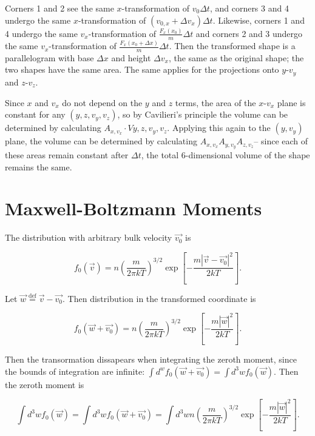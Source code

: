 \documentclass{hw-template}
\renewcommand{\defeq}{\stackrel{\text{def}}{=}}
\begin{document}
Corners 1 and 2 see the same $x$-transformation of $v_0 \Delta t$, and corners 3 and 4 undergo the same $x$-transformation of $(v_{0, x} + \Delta v_x)\Delta t$. Likewise, corners 1 and 4 undergo the same $v_x$-transformation of $\frac{F_x(x_0)}{m}\Delta t$ and corners 2 and 3 undergo the same $v_x$-transformation of $\frac{F_x(x_0 + \Delta x)}{m}\Delta t$. Then the transformed shape is a parallelogram with base $\Delta x$ and height $\Delta v_x$, the same as the original shape; the two shapes have the same area. The same applies for the projections onto $y$-$v_y$ and $z$-$v_z$.



Since $x$ and $v_x$ do not depend on the $y$ and $z$ terms, the area of the $x$-$v_x$ plane is constant for any $(y, z, v_y, v_z)$, so by Cavilieri's principle the volume can be determined by calculating $A_{x, v_x}\cdot V{y, z, v_y, v_z}$. Applying this again to the $(y, v_y)$ plane, the volume can be determined by calculating $A_{x, v_x}A_{y, v_y}A_{z, v_z}$-- since each of these areas remain constant after $\Delta t$, the total 6-dimensional volume of the shape remains the same.







\section{Maxwell-Boltzmann Moments}

The distribution with arbitrary bulk velocity $\vec{v_0}$ is

\begin{equation}
    f_0(\vec{v}) = n{\left( \frac{m}{2\pi k T} \right)}^{3/2} \exp \left[ -\frac{m |\vec{v} - \vec{v_0}|^2}{2kT}\right].
\end{equation}

Let $\vec{w} \defeq \vec{v} - \vec{v_0}$. Then distribution in the transformed coordinate is 


\begin{equation}
    f_0(\vec{w} + \vec{v_0}) = n{\left( \frac{m}{2\pi k T} \right)}^{3/2} \exp \left[ -\frac{m |\vec{w}|^2}{2kT}\right].
\end{equation}

Then the transormation dissapears when integrating the zeroth moment, since the bounds of integration are infinite: $\int d^w f_0(\vec{w} + \vec{v_0}) = \int d^3 w f_0(\vec{w})$. Then the zeroth moment is

\begin{equation}
    \int d^3w f_0(\vec{w}) = \int d^3w f_0(\vec{w} + \vec{v_0}) = \int d^3w n{\left( \frac{m}{2\pi k T} \right)}^{3/2} \exp \left[ -\frac{m |\vec{w}|^2}{2kT}\right].
\end{equation}
\end{document}
